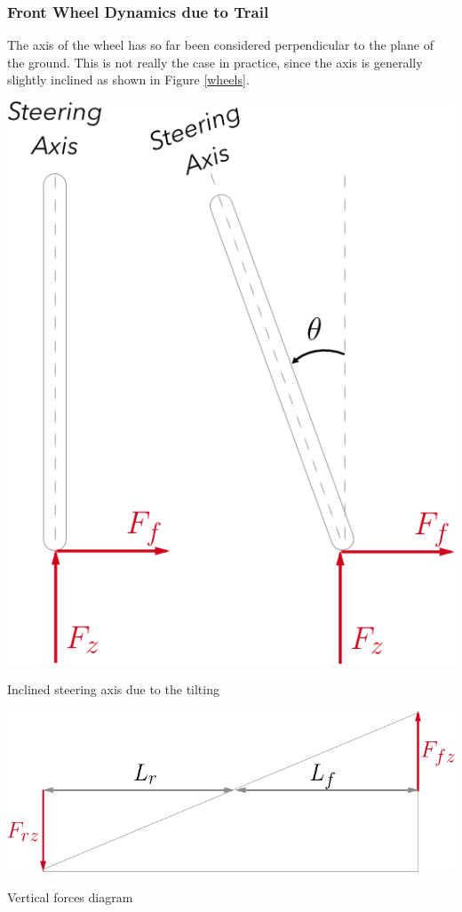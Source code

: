 \newpage
\subsubsection{\textbf{Front Wheel Dynamics due to Trail}}

The axis of the wheel has so far been considered perpendicular to the plane of the ground. This is not really the case in practice, since the axis is generally slightly inclined as shown in Figure \ref{wheels}. 
\begin{marginfigure}
	\includegraphics[width=1.0\linewidth]{figs/02/wheels}
	\caption{Inclined steering axis due to the tilting}
	\label{wheels}
\end{marginfigure}
\begin{marginfigure}
	\includegraphics[width=1.2\linewidth]{figs/02/forces}
	\caption{Vertical forces diagram}
	\label{forces}
\end{marginfigure}
